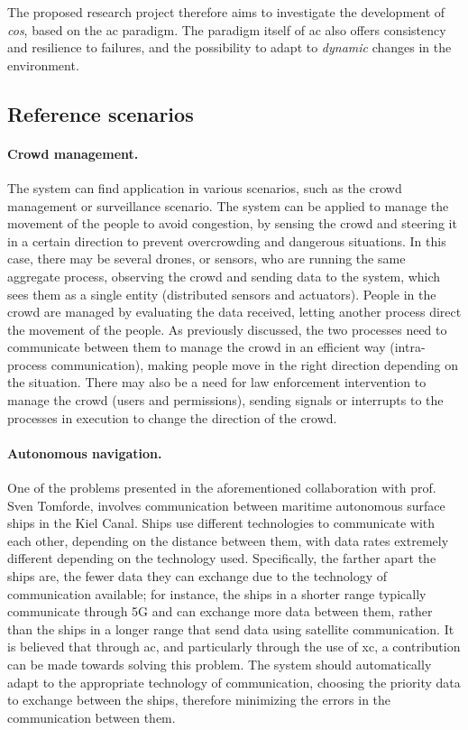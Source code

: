 \documentclass[12pt, a4paper]{article}
\begin{document}
The proposed research project therefore aims to investigate the development of \emph{\ac{cos}},
based on the \ac{ac} paradigm.
%
The paradigm itself of \ac{ac} also offers consistency and resilience to failures,
and the possibility to adapt to \emph{dynamic} changes in the environment.

\subsection{Reference scenarios}
\label{subsec:example-applications}

\sloppypar
\paragraph{Crowd management.}
The system can find application in various scenarios,
such as the crowd management or surveillance scenario.
%
The system can be applied to manage the movement of the people to avoid congestion,
by sensing the crowd and steering it in a certain direction to prevent overcrowding and dangerous situations.
%
In this case,
there may be several drones, or sensors, who are running the same aggregate process,
observing the crowd and sending data to the system,
which sees them as a single entity (distributed sensors and actuators).
%
People in the crowd are managed by evaluating the data received,
letting another process direct the movement of the people.
%
As previously discussed,
the two processes need to communicate between them to manage the crowd in an efficient way (intra-process communication),
making people move in the right direction depending on the situation.
%
There may also be a need for law enforcement intervention to manage the crowd (users and permissions),
sending signals or interrupts to the processes in execution to change the direction of the crowd.

\sloppypar
\paragraph{Autonomous navigation.}
One of the problems presented in the aforementioned collaboration with prof. Sven Tomforde,
involves communication between maritime autonomous surface ships in the Kiel Canal.
%
Ships use different technologies to communicate with each other,
depending on the distance between them,
with data rates extremely different depending on the technology used.
%
Specifically,
the farther apart the ships are,
the fewer data they can exchange due to the technology of communication available;
for instance,
the ships in a shorter range typically communicate through 5G and can exchange more data between them,
rather than the ships in a longer range that send data using satellite communication.
%
It is believed that through \ac{ac},
and particularly through the use of \ac{xc},
a contribution can be made towards solving this problem.
%
The system should automatically adapt to the appropriate technology of communication,
choosing the priority data to exchange between the ships,
therefore minimizing the errors in the communication between them.
\end{document}

